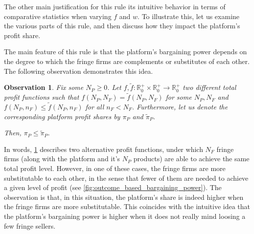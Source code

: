 \documentclass[a4paper]{article}
\newtheorem{observation}{Observation}
\begin{document}
The other main justification for this rule its intuitive behavior in terms of comparative statistics when varying $f$ and $w$.
To illustrate this, let us examine the various parts of this rule, and then discuss how they impact the platform's profit share.

The main feature of this rule is that the platform's bargaining power depends on the degree to which the fringe firms are complements or substitutes of each other.
The following observation demonstrates this idea.
\begin{observation}
    \label{prop:outcome_based_bargaining_power}
    Fix some $N_P \geq 0$. Let $f, \tilde{f}: \mathbb{R}^+_0 \times \mathbb{R}^+_0 \to \mathbb{R}^+_0$ two different total profit functions such that $f(N_P, N_F) = \tilde{f}(N_P, N_F)$ for some $N_P, N_F$ and $f(N_P, n_F) \leq \tilde{f}(N_P, n_F)$ for all $n_F < N_F$.
    Furthermore, let us denote the corresponding platform profit shares by $\pi_P$ and $\tilde{\pi}_P$.
    
    Then, $\pi_P \leq \tilde{\pi}_P$.
\end{observation}

In words, \cref{prop:outcome_based_bargaining_power} describes two alternative profit functions, under which $N_F$ fringe firms (along with the platform and it's $N_P$ products) are able to achieve the same total profit level.
However, in one of these cases, the fringe firms are more substitutable to each other, in the sense that fewer of them are needed to achieve a given level of profit (see \cref{fig:outcome_based_bargaining_power}).
The observation is that, in this situation, the platform's share is indeed higher when the fringe firms are more substitutable.
This coincides with the intuitive idea that the platform's bargaining power is higher when it does not really mind loosing a few fringe sellers.
\end{document}
